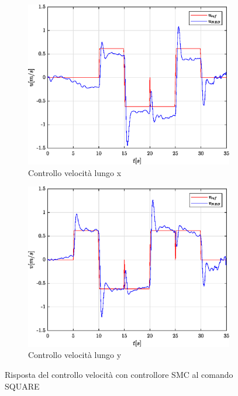 \begin{figure}
	\centering
	\begin{subfigure}{0.45\textwidth}
		\centering
		\includegraphics[width=1\textwidth]{Simulazioni/Figure/SMC/SQUARE/PositionControlXVel}
		\caption{Controllo velocità lungo x}
		\label{fig:SQUAREerrvelxSMC}
	\end{subfigure}
	\hfill
	\begin{subfigure}{0.45\textwidth}
		\centering
		\includegraphics[width=1\textwidth]{Simulazioni/Figure/SMC/SQUARE/PositionControlYVel}
		\caption{Controllo velocità lungo y}
		\label{fig:SQUAREerrvelySMC}
	\end{subfigure}
	\caption{Risposta del controllo velocità con controllore SMC al comando SQUARE}
\end{figure}

